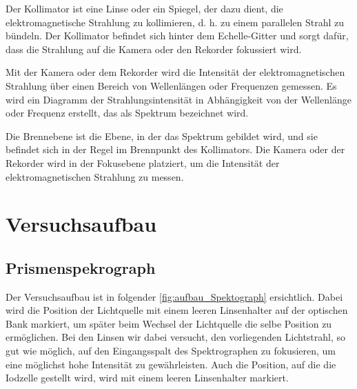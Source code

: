 \documentclass[12pt,english,ngerman]{scrartcl}
\begin{document}
Der Kollimator ist eine Linse oder ein Spiegel, der dazu dient, die elektromagnetische Strahlung zu kollimieren, d. h. zu 
einem parallelen Strahl zu bündeln. Der Kollimator befindet sich hinter dem Echelle-Gitter und sorgt dafür, dass die 
Strahlung auf die Kamera oder den Rekorder fokussiert wird.

Mit der Kamera oder dem Rekorder wird die Intensität der elektromagnetischen Strahlung über einen Bereich von Wellenlängen 
oder Frequenzen gemessen. Es wird ein Diagramm der Strahlungsintensität in Abhängigkeit von der Wellenlänge oder Frequenz 
erstellt, das als Spektrum bezeichnet wird.

Die Brennebene ist die Ebene, in der das Spektrum gebildet wird, und sie befindet sich in der Regel im Brennpunkt des 
Kollimators. Die Kamera oder der Rekorder wird in der Fokusebene platziert, um die Intensität der elektromagnetischen 
Strahlung zu messen.




\section{Versuchsaufbau} \label{sec:aufbau}

\subsection{Prismenspekrograph}

Der Versuchsaufbau ist in folgender \autoref{fig:aufbau_Spektograph} ersichtlich. Dabei wird die Position der Lichtquelle
mit einem leeren Linsenhalter auf der optischen Bank markiert, um später beim Wechsel der Lichtquelle die selbe Position zu
ermöglichen. Bei den Linsen wir dabei versucht, den vorliegenden Lichtstrahl, so gut wie möglich, auf den Eingangsspalt des
Spektrographen zu fokusieren, um eine möglichst hohe Intensität zu gewährleisten. Auch die Position, auf die die Iodzelle
gestellt wird, wird mit einem leeren Linsenhalter markiert.
\end{document}
